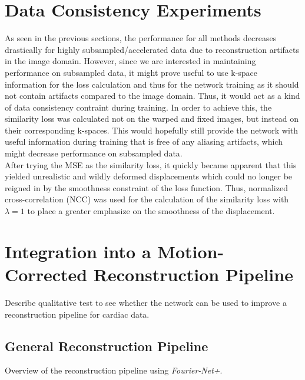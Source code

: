 \documentclass[english,version-2022-01]{uzl-thesis} %
\begin{document}
\section{Data Consistency Experiments}
As seen in the previous sections, the performance for all methods decreases drastically for highly subsampled/accelerated data due to reconstruction artifacts in the image domain. However, since we are interested in maintaining performance on subsampled data, it might prove useful to use k-space information for the loss calculation and thus for the network training as it should not contain artifacts compared to the image domain. Thus, it would act as a kind of data consistency contraint during training. In order to achieve this, the similarity loss was calculated not on the warped and fixed images, but instead on their corresponding k-spaces. This would hopefully still provide the network with useful information during training that is free of any aliasing artifacts, which might decrease performance on subsampled data. \\
After trying the MSE as the similarity loss, it quickly became apparent that this yielded unrealistic and wildly deformed displacements which could no longer be reigned in by the smoothness constraint of the loss function. Thus, normalized cross-correlation (NCC) was used for the calculation of the similarity loss with $\lambda = 1$ to place a greater emphasize on the smoothness of the displacement.

\section{Integration into a Motion-Corrected Reconstruction Pipeline} \label{Sec:IntegrationMotion-CorrectedReconstructionPipeline}
Describe qualitative test to see whether the network can be used to improve a reconstruction pipeline for cardiac data.


\subsection{General Reconstruction Pipeline}
Overview of the reconstruction pipeline using \emph{Fourier-Net+}.
\end{document}
